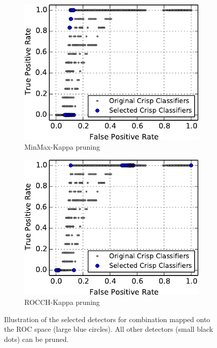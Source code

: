 \begin{figure}[tbh]
    \centering
    \begin{adjustbox}{minipage=\linewidth,scale=0.8}
    \begin{subfigure}[b]{\columnwidth}
        \centering
        \includegraphics[width=\linewidth]{figs/roc-MinMax-Kappa-selected-crop}
        \caption{MinMax-Kappa pruning}
        \label{fig:ROC-MinMax-Kappa}
    \vspace{0.7cm}
    \end{subfigure}
    \begin{subfigure}[b]{\columnwidth}
        \centering
        \includegraphics[width=\linewidth]{figs/roc-ROCCH-KAPPA-PairWise-selected-crop}
        \caption{ROCCH-Kappa pruning}
        \label{fig:ROC-ROCCH-Kappa}
    \end{subfigure}
    \caption{Illustration of the selected detectors for combination mapped onto the ROC space (large blue circles). All other detectors (small black dots) can be pruned.}
    \label{fig:ROC-MinMax-vs-ROCCH-Kappa}
    \end{adjustbox}
\end{figure}


